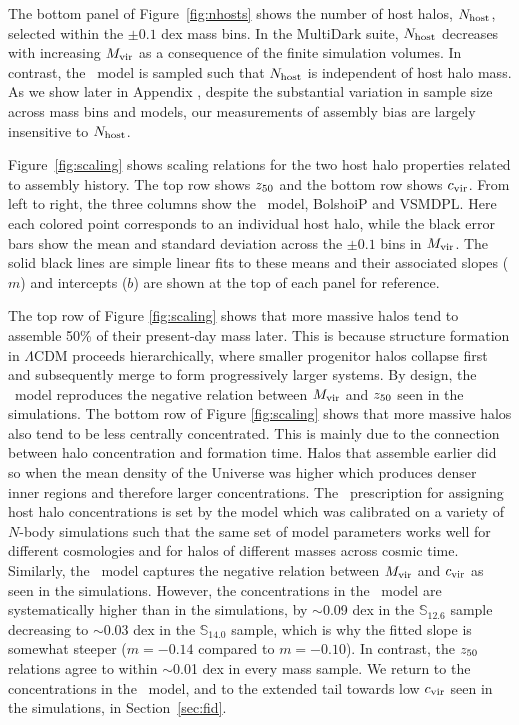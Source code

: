 \documentclass[twocolumn,apj,numberedappendix,twocolappendix,iop]{openjournal}
\begin{document}
The bottom panel of Figure~\ref{fig:nhosts} shows the number of host halos, $N_{\rm host}$, selected within the $\pm 0.1$ dex mass bins. In the MultiDark suite, $N_{\rm host}$ decreases with increasing $M_{\rm vir}$ as a consequence of the finite simulation volumes. In contrast, the \SatGen\ model is sampled such that $N_{\rm host}$ is independent of host halo mass. As we show later in Appendix \jsm{\ref{sec:binwidth}}, despite the substantial variation in sample size across mass bins and models, our measurements of assembly bias are largely insensitive to $N_{\rm host}$.

Figure~\ref{fig:scaling} shows scaling relations for the two host halo properties related to assembly history. The top row shows $z_{50}$ and the bottom row shows $c_{\rm vir}$. From left to right, the three columns show the \SatGen\ model, BolshoiP and VSMDPL. Here each colored point corresponds to an individual host halo, while the black error bars show the mean and standard deviation across the $\pm 0.1$ bins in $M_{\rm vir}$. The solid black lines are simple linear fits to these means and their associated slopes ($m$) and intercepts ($b$) are shown at the top of each panel for reference.

The top row of Figure \ref{fig:scaling} shows that more massive halos tend to assemble 50\% of their present-day mass later. This is because structure formation in $\Lambda$CDM proceeds hierarchically, where smaller progenitor halos collapse first and subsequently merge to form progressively larger systems. By design, the \SatGen\ model reproduces the negative relation between $M_{\rm vir}$ and $z_{50}$ seen in the simulations. The bottom row of Figure \ref{fig:scaling} shows that more massive halos also tend to be less centrally concentrated. This is mainly due to the connection between halo concentration and formation time. Halos that assemble earlier did so when the mean density of the Universe was higher which produces denser inner regions and therefore larger concentrations. The \SatGen\ prescription for assigning host halo concentrations is set by the \cite{Zhao.etal.09} model which was calibrated on a variety of $N$-body simulations such that the same set of model parameters works well for different cosmologies and for halos of different masses across cosmic time. Similarly, the \SatGen\ model captures  the negative relation between $M_{\rm vir}$ and $c_{\rm vir}$ as seen in the simulations. However, the concentrations in the \SatGen\ model are systematically higher than in the simulations, by $\sim$0.09 dex in the $\mathbb{S}_{12.6}$ sample decreasing to $\sim$0.03 dex in the $\mathbb{S}_{14.0}$ sample, which is why the fitted slope is somewhat steeper ($m = -0.14$ compared to $m = -0.10$). In contrast, the $z_{50}$ relations agree to within $\sim$0.01 dex in every mass sample. We return to the concentrations in the \SatGen\ model, and to the extended tail towards low $c_{\rm vir}$ seen in the simulations, in Section~\ref{sec:fid}.
\end{document}
